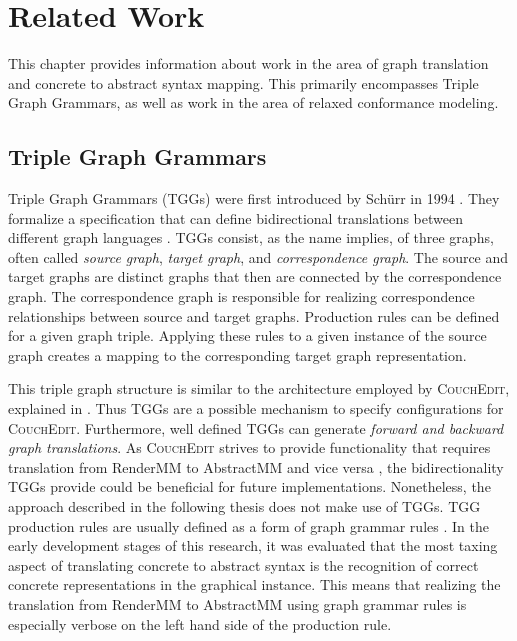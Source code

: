 \chapter{Related Work}
\label{ch:related_work}
This chapter provides information about work in the area of graph translation and concrete to abstract syntax mapping. This primarily encompasses Triple Graph Grammars, as well as work in the area of relaxed conformance modeling.




\section{Triple Graph Grammars}
\label{sec:tggs}
Triple Graph Grammars (TGGs) were first introduced by Schürr in 1994 \cite{schurr_specification_1994}. They formalize a specification that can define bidirectional translations between different graph languages \cite{schurr_15_2008}. TGGs consist, as the name implies, of three graphs, often called \emph{source graph}, \emph{target graph}, and \emph{correspondence graph}. The source and target graphs are distinct graphs that then are connected by the correspondence graph. The correspondence graph is responsible for realizing correspondence relationships between source and target graphs. Production rules can be defined for a given graph triple. Applying these rules to a given instance of the source graph creates a mapping to the corresponding target graph representation.

This triple graph structure is similar to the architecture employed by \textsc{CouchEdit}, explained in . Thus TGGs are a possible mechanism to specify configurations for \textsc{CouchEdit}. Furthermore, well defined TGGs can generate \emph{forward and backward graph translations}. As \textsc{CouchEdit} strives to provide functionality that requires translation from RenderMM to AbstractMM and vice versa \cite{nachreiner_couchedit_2020}, the bidirectionality TGGs provide could be beneficial for future implementations. Nonetheless, the approach described in the following thesis does not make use of TGGs. TGG production rules are usually defined as a form of graph grammar rules \cite{schurr_15_2008}. In the early development stages of this research, it was evaluated that the most taxing aspect of translating concrete to abstract syntax is the recognition of correct concrete representations in the graphical instance. This means that realizing the translation from RenderMM to AbstractMM using graph grammar rules is especially verbose on the left hand side of the production rule.

